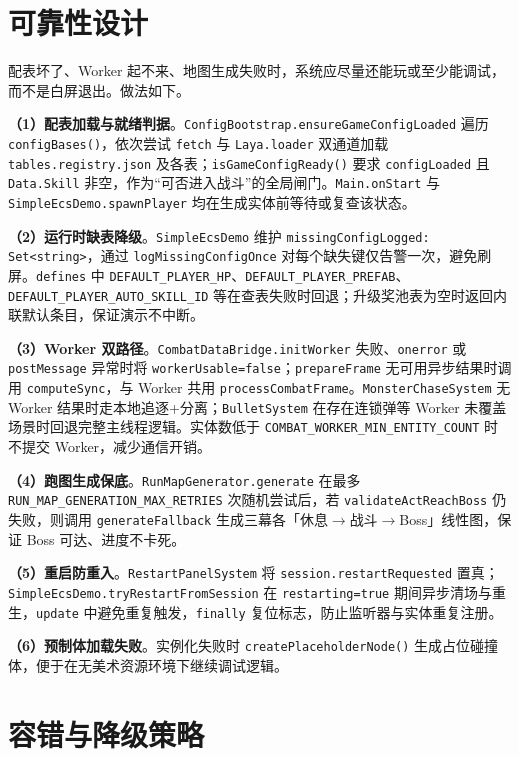 \documentclass[UTF8,a4paper]{ctexart}
\begin{document}
\section{可靠性设计}
\label{sec:reliability}

配表坏了、Worker 起不来、地图生成失败时，系统应尽量还能玩或至少能调试，而不是白屏退出。做法如下。

\textbf{（1）配表加载与就绪判据}。\texttt{ConfigBootstrap.ensureGameConfigLoaded} 遍历 \texttt{configBases()}，依次尝试 \texttt{fetch} 与 \texttt{Laya.loader} 双通道加载 \texttt{tables.registry.json} 及各表；\texttt{isGameConfigReady()} 要求 \texttt{configLoaded} 且 \texttt{Data.Skill} 非空，作为“可否进入战斗”的全局闸门。\texttt{Main.onStart} 与 \texttt{SimpleEcsDemo.spawnPlayer} 均在生成实体前等待或复查该状态。

\textbf{（2）运行时缺表降级}。\texttt{SimpleEcsDemo} 维护 \texttt{missingConfigLogged: Set<string>}，通过 \texttt{logMissingConfigOnce} 对每个缺失键仅告警一次，避免刷屏。\texttt{defines} 中 \texttt{DEFAULT\_PLAYER\_HP}、\texttt{DEFAULT\_PLAYER\_PREFAB}、\texttt{DEFAULT\_PLAYER\_AUTO\_SKILL\_ID} 等在查表失败时回退；升级奖池表为空时返回内联默认条目，保证演示不中断。

\textbf{（3）Worker 双路径}。\texttt{CombatDataBridge.initWorker} 失败、\texttt{onerror} 或 \texttt{postMessage} 异常时将 \texttt{workerUsable=false}；\texttt{prepareFrame} 无可用异步结果时调用 \texttt{computeSync}，与 Worker 共用 \texttt{processCombatFrame}。\texttt{MonsterChaseSystem} 无 Worker 结果时走本地追逐+分离；\texttt{BulletSystem} 在存在连锁弹等 Worker 未覆盖场景时回退完整主线程逻辑。实体数低于 \texttt{COMBAT\_WORKER\_MIN\_ENTITY\_COUNT} 时不提交 Worker，减少通信开销。

\textbf{（4）跑图生成保底}。\texttt{RunMapGenerator.generate} 在最多 \texttt{RUN\_MAP\_GENERATION\_MAX\_RETRIES} 次随机尝试后，若 \texttt{validateActReachBoss} 仍失败，则调用 \texttt{generateFallback} 生成三幕各「休息$\rightarrow$战斗$\rightarrow$Boss」线性图，保证 Boss 可达、进度不卡死。

\textbf{（5）重启防重入}。\texttt{RestartPanelSystem} 将 \texttt{session.restartRequested} 置真；\texttt{SimpleEcsDemo.tryRestartFromSession} 在 \texttt{restarting=true} 期间异步清场与重生，\texttt{update} 中避免重复触发，\texttt{finally} 复位标志，防止监听器与实体重复注册。

\textbf{（6）预制体加载失败}。实例化失败时 \texttt{createPlaceholderNode()} 生成占位碰撞体，便于在无美术资源环境下继续调试逻辑。

\section{容错与降级策略}
\label{sec:fault-tolerance}
\end{document}
